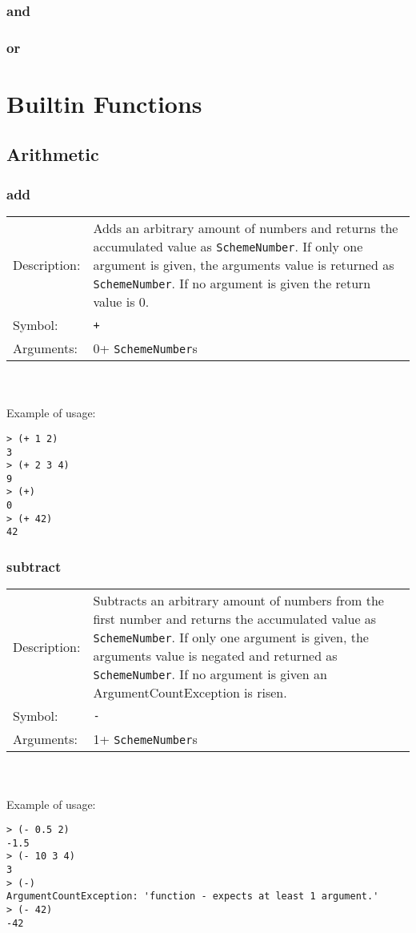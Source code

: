 \documentclass[12pt,a4paper]{scrartcl}
\begin{document}
\subsubsection*{and}
\subsubsection*{or}
\section*{Builtin Functions}

\subsection*{Arithmetic}

\subsubsection*{add}
\begin{tabular}{l  p{13cm}}
Description: & Adds an arbitrary amount of numbers and returns the accumulated value as \lstinline{SchemeNumber}. If only one argument is given, the arguments value is returned as \lstinline{SchemeNumber}. If no argument is given the return value is 0.\\
Symbol: & \lstinline{+}\\
Arguments: & 0+ \lstinline{SchemeNumber}s\\
\end{tabular}
\\
\\
Example of usage:
\begin{lstlisting}
> (+ 1 2)
3
> (+ 2 3 4)
9
> (+)
0
> (+ 42)
42
\end{lstlisting}

\subsubsection*{subtract}
\begin{tabular}{l  p{13cm}}
Description: & Subtracts an arbitrary amount of numbers from the first number and returns the accumulated value as \lstinline{SchemeNumber}. If only one argument is given, the arguments value is negated and returned as \lstinline{SchemeNumber}. If no argument is given an ArgumentCountException is risen.\\
Symbol: & \lstinline{-}\\
Arguments: & 1+ \lstinline{SchemeNumber}s\\
\end{tabular}
\\
\\
Example of usage:
\begin{lstlisting}
> (- 0.5 2)
-1.5
> (- 10 3 4)
3
> (-)
ArgumentCountException: 'function - expects at least 1 argument.'                                                        
> (- 42)
-42
\end{lstlisting}
\end{document}
